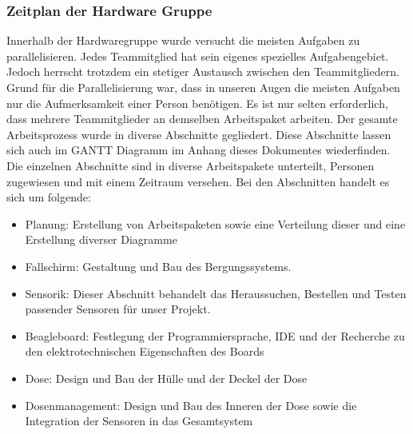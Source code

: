 \subsubsection{Zeitplan der Hardware Gruppe}
Innerhalb der Hardwaregruppe wurde versucht die meisten Aufgaben zu parallelisieren. Jedes Teammitglied hat sein eigenes spezielles Aufgabengebiet. Jedoch herrscht trotzdem ein stetiger Austausch zwischen den Teammitgliedern. Grund für die Parallelisierung war, dass in unseren Augen die meisten Aufgaben  nur die Aufmerksamkeit einer Person benötigen. Es ist nur selten erforderlich, dass mehrere Teammitglieder an demselben Arbeitspaket arbeiten. Der gesamte Arbeitsprozess wurde in diverse Abschnitte gegliedert. Diese Abschnitte lassen sich auch im GANTT Diagramm im Anhang dieses Dokumentes wiederfinden. Die einzelnen Abschnitte sind in diverse Arbeitspakete unterteilt, Personen zugewiesen und mit einem Zeitraum versehen. Bei den Abschnitten handelt es sich um folgende:
\begin{itemize}
\item Planung: Erstellung von Arbeitspaketen sowie eine Verteilung dieser und eine Erstellung diverser Diagramme
\item Fallschirm: Gestaltung und Bau des Bergungssystems.
\item Sensorik: Dieser Abschnitt behandelt das Heraussuchen, Bestellen und Testen passender Sensoren für unser Projekt.
\item Beagleboard: Festlegung der Programmiersprache, IDE und der Recherche zu den elektrotechnischen Eigenschaften des Boards
\item Dose: Design und Bau der Hülle und der Deckel der Dose
\item Dosenmanagement: Design und Bau des Inneren der Dose sowie die Integration der Sensoren in das Gesamtsystem
\end{itemize}

